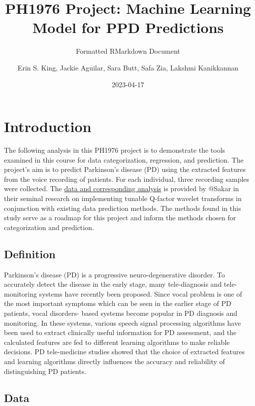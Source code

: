 \documentclass[
]{article}
\title{PH1976 Project: Machine Learning Model for PPD Predictions}
\subtitle{Formatted RMarkdown Document}
\author{Erin S. King,
Jackie Aguilar,
Sara Butt,
Safa Zia,
Lakshmi Kanikkannan}
\date{2023-04-17}
\begin{document}
\maketitle

{
\setcounter{tocdepth}{2}
\tableofcontents
}
\hypertarget{introduction}{%
\section{Introduction}\label{introduction}}

The following analysis in this PH1976 project is to demonstrate the tools examined in this course for data categorization, regression, and prediction. The project's aim is to predict Parkinson's disease (PD) using the extracted features from the voice recording of patients. For each individual, three recording samples were collected. The \href{https://doi.org/10.1016/j.asoc.2018.10.022}{data and corresponding analysis} is provided by @Sakar in their seminal research on implementing tunable Q-factor wavelet transforms in conjunction with existing data prediction methods. The methods found in this study serve as a roadmap for this project and inform the methods chosen for categorization and prediction.

\hypertarget{definition}{%
\subsection{Definition}\label{definition}}

Parkinson's disease (PD) is a progressive neuro-degenerative disorder. To accurately detect the disease in the
early stage, many tele-diagnosis and tele-monitoring systems have recently been proposed. Since vocal problem is one of the most important symptoms which can be seen in the earlier stage of PD patients, vocal disorders-
based systems become popular in PD diagnosis and monitoring. In these systems, various speech signal processing algorithms have been used to extract clinically useful information for PD assessment, and the
calculated features are fed to different learning algorithms to make reliable decisions. PD tele-medicine studies showed that the choice of extracted features and learning algorithms directly influences the accuracy and
reliability of distinguishing PD patients.

\hypertarget{data}{%
\subsection{Data}\label{data}}
\end{document}
